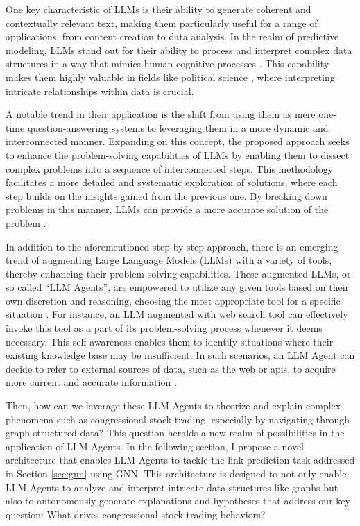 \documentclass[15pt,letterpaper]{article}
\begin{document}
One key characteristic of LLMs is their ability to generate coherent and contextually relevant text, making them particularly useful for a range of applications, from content creation to data analysis. In the realm of predictive modeling, LLMs stand out for their ability to process and interpret complex data structures in a way that mimics human cognitive processes \citep{Kojima2022LargeLM, Hayashi2019LatentRL}. 
This capability makes them highly valuable in fields like political science \citep{Luitse2021TheGT}, where interpreting intricate relationships within data is crucial.

A notable trend in their application is the shift from using them as mere one-time question-answering systems to leveraging them in a more dynamic and interconnected manner. Expanding on this concept, the proposed approach seeks to enhance the problem-solving capabilities of LLMs by enabling them to dissect complex problems into a sequence of interconnected steps. This methodology facilitates a more detailed and systematic exploration of solutions, where each step builds on the insights gained from the previous one. By breaking down problems in this manner, LLMs can provide a more accurate solution of the problem \citep{cot, yao2023tree}.

In addition to the aforementioned step-by-step approach, there is an emerging trend of augmenting Large Language Models (LLMs) with a variety of tools, thereby enhancing their problem-solving capabilities. These augmented LLMs, or so called ``LLM Agents'', are empowered to utilize any given tools based on their own discretion and reasoning, choosing the most appropriate tool for a specific situation \citep{yao2023react}. 
For instance, an LLM augmented with web search tool can effectively invoke this tool as a part of its problem-solving process whenever it deems necessary.
This self-awareness enables them to identify situations where their existing knowledge base may be insufficient. In such scenarios, an LLM Agent can decide to refer to external sources of data, such as the web or apis, to acquire more current and accurate information \citep{Qin2023ToolLLMFL, patil2023gorilla}. 

Then, how can we leverage these LLM Agents to theorize and explain complex phenomena such as congressional stock trading, especially by navigating through graph-structured data? This question heralds a new realm of possibilities in the application of LLM Agents. In the following section, I propose a novel architecture that enables LLM Agents to tackle the link prediction task addressed in Section \ref{sec:gnn} using GNN. This architecture is designed to not only enable LLM Agents to analyze and interpret intricate data structures like graphs but also to autonomously generate explanations and hypotheses that address our key question: What drives congressional stock trading behaviors?
\end{document}
